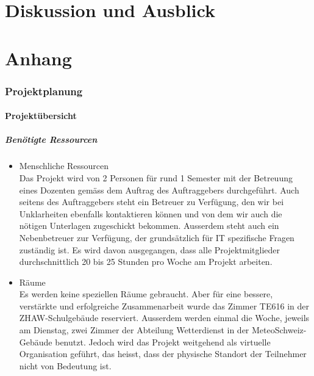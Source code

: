 \documentclass[a4paper,10pt]{article}
\begin{document}



\newpage
\part{Diskussion und Ausblick}

\newpage
\part{Anhang}

\section{Projektplanung}

\subsection{Projektübersicht}

\subsubsection{Benötigte Ressourcen}
\begin{itemize}
\item Menschliche Ressourcen \\
Das Projekt wird von 2 Personen für rund 1 Semester mit der Betreuung
eines Dozenten gemäss dem Auftrag des Auftraggebers durchgeführt. Auch
seitens des Auftraggebers steht ein Betreuer zu Verfügung, den wir bei
Unklarheiten ebenfalls kontaktieren können und von dem wir auch die
nötigen Unterlagen zugeschickt bekommen. Ausserdem steht auch ein
Nebenbetreuer zur Verfügung, der grundsätzlich für IT spezifische Fragen
zuständig ist. Es wird davon ausgegangen, dass alle Projektmitglieder
durchschnittlich 20 bis 25 Stunden pro Woche am Projekt arbeiten.

\item Räume \\
Es werden keine speziellen Räume gebraucht. Aber für eine bessere,
verstärkte und erfolgreiche Zusammenarbeit wurde das Zimmer TE616 in der
ZHAW-Schulgebäude reserviert. Ausserdem werden einmal die Woche, jeweils
am Dienstag, zwei Zimmer der Abteilung Wetterdienst in der
MeteoSchweiz-Gebäude benutzt. Jedoch wird das Projekt weitgehend als
virtuelle Organisation geführt, das heisst, dass der physische Standort
der Teilnehmer nicht von Bedeutung ist.

\end{itemize}
\end{document}
